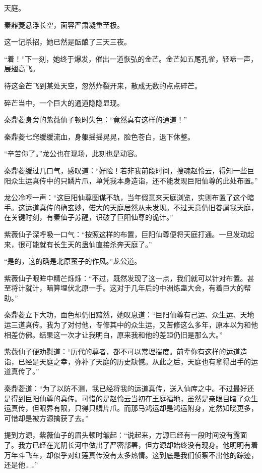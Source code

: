 
\begin{this_body}

天庭。

秦鼎菱悬浮长空，面容严肃凝重至极。

这一记杀招，她已然是酝酿了三天三夜。

“着！”下一刻，她终于爆发，催出一道恢弘的金芒。金芒如五尾孔雀，轻啼一声，展翅高飞。

待这金芒飞到某处天空，忽然炸裂开来，散成无数的点点碎芒。

碎芒当中，一个巨大的通道隐隐显现。

秦鼎菱身旁的紫薇仙子顿时失色：“竟然真有这样的通道！”

秦鼎菱七窍缓缓流血，身躯摇摇晃晃，脸色苍白，退下休整。

“辛苦你了。”龙公也在现场，此刻也是动容。

秦鼎菱缓过几口气，感叹道：“好险！若非我前段时间，搜魂赵怜云，得知一些巨阳众生运真传中的只鳞片爪，单凭我本身造诣，还不能发现巨阳仙尊的此处布置。”

龙公冷哼一声：“这巨阳仙尊图谋不轨，当年假意来天庭浏览，实则布置了这个暗手。这运道真传的确玄妙，偌大的天庭居然从未发现。不过天意仍旧眷属我天庭，在关键时刻，有秦仙子苏醒，识破了巨阳仙尊的诡计。”

紫薇仙子深呼吸一口气：“按照这样的布置，巨阳仙尊便将天庭打通。一旦发动起来，很可能就有长生天的蛊仙直接杀奔天庭了。”

“是的，这的确是北原蛮子的作风。”龙公道。

紫薇仙子眼眸中精芒烁烁：“不过，既然发现了这一点，我们就可以针对布置。甚至将计就计，暗算埋伏北原一手。这对于几年后的中洲炼蛊大会，有着巨大的帮助。”

秦鼎菱立下大功，面色却仍旧黯然，她叹息道：“巨阳仙尊有己运、众生运、天地运三道真传。我为了对付他，专修其中的众生运，又苦修这么多年，原本以为和他相差仿佛。结果这一次才让我明白，原来我和他的差距仍旧是那么大。”

紫薇仙子便劝慰道：“历代的尊者，都不可以常理揣度。前辈你有这样的运道造诣，已经是天庭之幸，弥补了天庭的历史缺憾。从此之后，天庭也有拿得出手的运道真传了。”

秦鼎菱道：“为了以防不测，我已经将我的运道真传，送入仙库之中。不过最好还是得到巨阳仙尊的真传。可惜的是赵怜云当初在王庭福地，虽然是亲眼目睹了众生运真传，但眼界有限，只得只鳞片爪。而那马鸿运却是鸿运附身，定然知晓更多，可惜却是被方源擒获了去。”

提到方源，紫薇仙子的眉头顿时皱起：“说起来，方源已经有一段时间没有露面了。我方已经在光阴长河中做出了严密部署，但方源却始终没有现身。他明明有着万年斗飞车，却似乎对红莲真传没有太多热情。这到底是我们侦察不出他的踪迹，还是他……”


\end{this_body}
